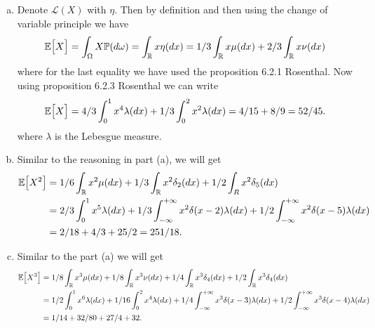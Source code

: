 \begin{solution}
	\begin{enumerate}[(a)]
		\item Denote $ \mathcal{L}(X) $ with $ \eta $. Then by definition and then using the change of variable principle we have
		\[ \mathbb{E}\big[X\big] = \int_\Omega X \mathbb{P}(d\omega) = \int_{\mathbb{R}} x \eta(dx) = 1/3\int_{\mathbb{R}}  x \mu(dx) + 2/3\int_{\mathbb{R}} x \nu(dx)  \]
		where for the last equality we have used the proposition 6.2.1 Rosenthal. Now using proposition 6.2.3 Rosenthal we can write
		\[ \mathbb{E}\big[X\big] = 4/3\int_{0}^{1} x^4 \lambda(dx)  + 1/3\int_{0}^{2} x^2 \lambda(dx)  = 4/15 + 8/9 = 52/45. \]
		where $ \lambda $ is the Lebesgue measure.
		
		\item Similar to the reasoning in part (a), we will get
		\begin{align*}
			\mathbb{E}\big[X^2\big] &= 1/6\int_{\mathbb{R}} x^2 \mu(dx) + 1/3\int_{\mathbb{R}} x^2 \delta_2(dx) + 1/2\int_R x^2 \delta_5(dx) \\
			&= 2/3 \int_{0}^{1}x^5 \lambda(dx) + 1/3\int_{-\infty}^{+\infty} x^2\delta(x-2)\lambda(dx) + 1/2\int_{-\infty}^{+\infty} x^2\delta(x-5)\lambda(dx) \\
			&= 2/18 + 4/3 + 25/2 = 251/18.
		\end{align*}
		
		\item Similar to the part (a) we will get
		\begin{align*}
			\mathbb{E}\big[X^3\big] &= 1/8\int_{\mathbb{R}} x^3 \mu(dx) + 1/8\int_{\mathbb{R}} x^3\nu(dx) + 1/4\int_{\mathbb{R}} x^3 \delta_4(dx) + 1/2\int_{\mathbb{R}} x^3\delta_4(dx) \\
			&= 1/2\int_{0}^{1}x^6\lambda(dx) + 1/16\int_{0}^{2}x^4\lambda(dx) + 1/4\int_{-\infty}^{+\infty}x^3\delta(x-3)\lambda(dx) + 1/2\int_{-\infty}^{+\infty} x^3 \delta(x-4) \lambda(dx)\\
			&=1/14 + 32/80 + 27/4 + 32.
		\end{align*}
	\end{enumerate}
\end{solution}


